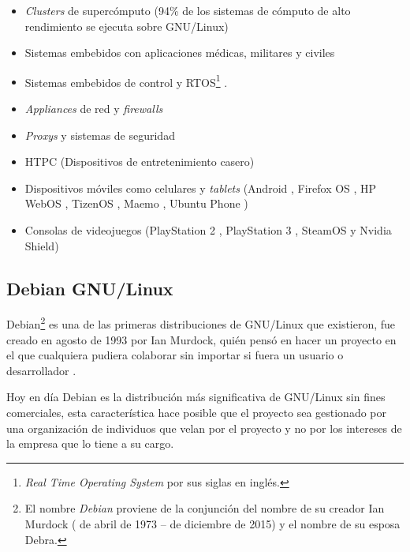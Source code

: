 \begin{itemize}
  \item \textit{Clusters} de superc\'{o}mputo (94\% de los sistemas de c\'{o}mputo de alto rendimiento se ejecuta sobre GNU/Linux) \cite{_tic_????}\cite{_94_????}
  \item Sistemas embebidos con aplicaciones m\'{e}dicas, militares y civiles \cite{_elinux.org_????}\cite{_rtos_????}
  \item Sistemas embebidos de control y \textsc{RTOS}\footnote{\textit{Real Time Operating System} por sus siglas en ingl\'{e}s.} \cite{_uclinux_????}\cite{_rtos_????}.
  \item \textit{Appliances} de red y \textit{firewalls} \cite{_router/bridge_????}\cite{_endian_????}
  \item \textit{Proxys} y sistemas de seguridad \cite{_f5_????}\cite{_junos_????}\cite{_infoblox_????}
  \item \textsc{HTPC} (Dispositivos de entretenimiento casero) \cite{_openelec_????}
  \item Dispositivos m\'{o}viles como celulares y \textit{tablets} (Android \cite{_android_????}, Firefox OS \cite{_firefox_????}, HP WebOS \cite{_hp_????}, TizenOS \cite{_tizen_????}, Maemo \cite{_maemo.org_????}, Ubuntu Phone \cite{_ubuntu_????})
  \item Consolas de videojuegos (PlayStation 2 \cite{_ps2_????}, PlayStation 3 \cite{_open_????}, SteamOS y Nvidia Shield)
\end{itemize}

  \subsection {Debian GNU/Linux}

Debian\footnote{El nombre \textit{Debian} proviene de la conjunci\'{o}n del nombre de su creador Ian Murdock ( de abril de 1973 –  de diciembre de 2015) y el nombre de su esposa Debra.} es una de las primeras distribuciones de GNU/Linux que existieron, fue creado en agosto de 1993 por Ian Murdock, qui\'{e}n pens\'{o} en hacer un proyecto en el que cualquiera pudiera colaborar sin importar si fuera un usuario o desarrollador \cite{_debian_????}.

Hoy en d\'{i}a Debian es la distribuci\'{o}n m\'{a}s significativa de GNU/Linux sin fines comerciales, esta caracter\'{i}stica hace posible que el proyecto sea gestionado por una organizaci\'{o}n de individuos que velan por el proyecto y no por los intereses de la empresa que lo tiene a su cargo.

